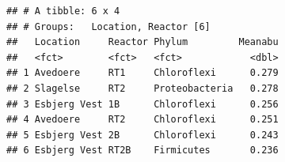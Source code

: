 \documentclass[
]{book}
\newenvironment{Shaded}{\begin{snugshade}}{\end{snugshade}}
\newcommand{\AttributeTok}[1]{\textcolor[rgb]{0.77,0.63,0.00}{#1}}
\newcommand{\CommentTok}[1]{\textcolor[rgb]{0.56,0.35,0.01}{\textit{#1}}}
\newcommand{\FunctionTok}[1]{\textcolor[rgb]{0.00,0.00,0.00}{#1}}
\newcommand{\NormalTok}[1]{#1}
\newcommand{\OtherTok}[1]{\textcolor[rgb]{0.56,0.35,0.01}{#1}}
\newcommand{\SpecialCharTok}[1]{\textcolor[rgb]{0.00,0.00,0.00}{#1}}
\begin{document}
\begin{Shaded}
\end{Shaded}

\begin{verbatim}
## # A tibble: 6 x 4
## # Groups:   Location, Reactor [6]
##   Location     Reactor Phylum         Meanabu
##   <fct>        <fct>   <fct>            <dbl>
## 1 Avedoere     RT1     Chloroflexi      0.279
## 2 Slagelse     RT2     Proteobacteria   0.278
## 3 Esbjerg Vest 1B      Chloroflexi      0.256
## 4 Avedoere     RT2     Chloroflexi      0.251
## 5 Esbjerg Vest 2B      Chloroflexi      0.243
## 6 Esbjerg Vest RT2B    Firmicutes       0.236
\end{verbatim}
\end{document}
